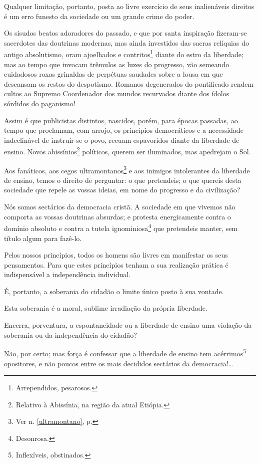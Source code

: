Qualquer limitação, portanto, posta ao livre exercício de seus
inalienáveis direitos é um erro funesto da sociedade ou um grande crime
do poder.

Os sisudos beatos adoradores do passado, e que por santa inspiração
fizeram-se sacerdotes das doutrinas modernas, mas ainda investidos das
sacras relíquias do antigo absolutismo, oram ajoelhados e
contritos\footnote{Arrependidos, pesarosos.} diante do estro da
liberdade; mas ao tempo que invocam trêmulos as luzes do progresso, vão
semeando cuidadosos roxas grinaldas de perpétuas saudades sobre a lousa
em que descansam os restos do despotismo. Romanos degenerados do
pontificado rendem cultos ao Supremo Coordenador dos mundos recurvados
diante dos ídolos sórdidos do paganismo!

Assim é que publicistas distintos, nascidos, porém, para épocas
passadas, ao tempo que proclamam, com arrojo, os princípios democráticos
e a necessidade indeclinável de instruir-se o povo, recuam espavoridos
diante da liberdade de ensino. Novos abissínios\footnote{Relativo à
  Abissínia, na região da atual Etiópia.} políticos, querem ser
iluminados, mas apedrejam o Sol.

Aos fanáticos, aos cegos ultramontanos\footnote{Ver n. \ref{ultramontano}, 
p. \pageref{ultramontano}} e aos inimigos intolerantes da liberdade de ensino,
temos o direito de perguntar: o que pretendeis; o que quereis desta
sociedade que repele as vossas ideias, em nome do progresso e da
civilização?

Nós somos sectários da democracia cristã. A sociedade em que vivemos não
comporta as vossas doutrinas absurdas; e protesta energicamente contra o
domínio absoluto e contra a tutela ignominiosa\footnote{Desonrosa.}
que pretendeis manter, sem título algum para fazê-lo.

Pelos nossos princípios, todos os homens são livres em manifestar os
seus pensamentos. Para que estes princípios tenham a sua realização
prática é indispensável a independência individual.

É, portanto, a soberania do cidadão o limite único posto à sua vontade.

Esta soberania é a moral, sublime irradiação da própria liberdade.

Encerra, porventura, a espontaneidade ou a liberdade de ensino uma
violação da soberania ou da independência do cidadão?

Não, por certo; mas força é confessar que a liberdade de ensino tem
acérrimos\footnote{Inflexíveis, obstinados.} opositores, e não poucos
entre os mais decididos sectários da democracia!\ldots{}

